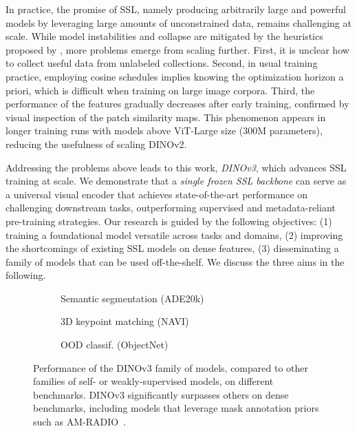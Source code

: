 In practice, the promise of SSL, namely producing arbitrarily large and powerful models by leveraging large amounts of unconstrained data, remains challenging at scale. 
While model instabilities and collapse are mitigated by the heuristics proposed by \citet{oquab2024dinov2}, more problems emerge from scaling further. 
First, it is unclear how to collect useful data from unlabeled collections. 
Second, in usual training practice, employing cosine schedules implies knowing the optimization horizon a priori, which is difficult when training on large image corpora. 
Third, the performance of the features gradually decreases after early training, confirmed by visual inspection of the patch similarity maps. 
This phenomenon appears in longer training runs with models above ViT-Large size (300M parameters), reducing the usefulness of scaling DINOv2.

Addressing the problems above leads to this work, \emph{DINOv3}, which advances SSL training at scale.  
We demonstrate that a \emph{single frozen SSL backbone} can serve as a universal visual encoder that achieves state-of-the-art performance on challenging downstream tasks, outperforming supervised and metadata-reliant pre-training strategies. 
Our research is guided by the following objectives: 
(1) training a foundational model versatile across tasks and domains, 
(2) improving the shortcomings of existing SSL models on dense features, 
(3) disseminating a family of models that can be used off-the-shelf.  
We discuss the three aims in the following.

\begin{figure}[t]
    \begin{subfigure}[b]{0.35\textwidth}
        \centering
        
        \vspace{-15pt}
        \caption{Semantic segmentation (ADE20k)}
   \end{subfigure}%
   \hfill%
    \begin{subfigure}[b]{0.30\textwidth}
        \centering
        
        \vspace{-15pt}
        \caption{3D keypoint matching (NAVI)}
   \end{subfigure}%
   \hfill%
    \begin{subfigure}[b]{0.30\textwidth}
        \centering
        
        \vspace{-15pt}
        \caption{OOD classif. (ObjectNet)}
   \end{subfigure}
   \caption{Performance of the DINOv3 family of models, compared to other families of self- or weakly-supervised models, on different benchmarks. DINOv3 significantly surpasses others on dense benchmarks, including models that leverage mask annotation priors such as AM-RADIO~\citep{heinrich2025radiov25}.}
   \label{fig:intro:family}
\end{figure}


